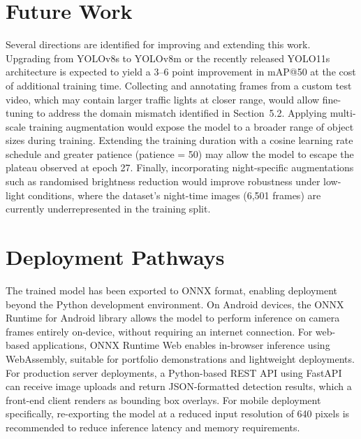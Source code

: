 \section{Future Work}

Several directions are identified for improving and extending this work. Upgrading from YOLOv8s to YOLOv8m or the recently released YOLO11s architecture is expected to yield a 3--6 point improvement in mAP@50 at the cost of additional training time. Collecting and annotating frames from a custom test video, which may contain larger traffic lights at closer range, would allow fine-tuning to address the domain mismatch identified in Section~5.2. Applying multi-scale training augmentation would expose the model to a broader range of object sizes during training. Extending the training duration with a cosine learning rate schedule and greater patience (patience = 50) may allow the model to escape the plateau observed at epoch 27. Finally, incorporating night-specific augmentations such as randomised brightness reduction would improve robustness under low-light conditions, where the dataset's night-time images (6,501 frames) are currently underrepresented in the training split.

\section{Deployment Pathways}

The trained model has been exported to ONNX format, enabling deployment beyond the Python development environment. On Android devices, the ONNX Runtime for Android library allows the model to perform inference on camera frames entirely on-device, without requiring an internet connection. For web-based applications, ONNX Runtime Web enables in-browser inference using WebAssembly, suitable for portfolio demonstrations and lightweight deployments. For production server deployments, a Python-based REST API using FastAPI can receive image uploads and return JSON-formatted detection results, which a front-end client renders as bounding box overlays. For mobile deployment specifically, re-exporting the model at a reduced input resolution of 640 pixels is recommended to reduce inference latency and memory requirements.

